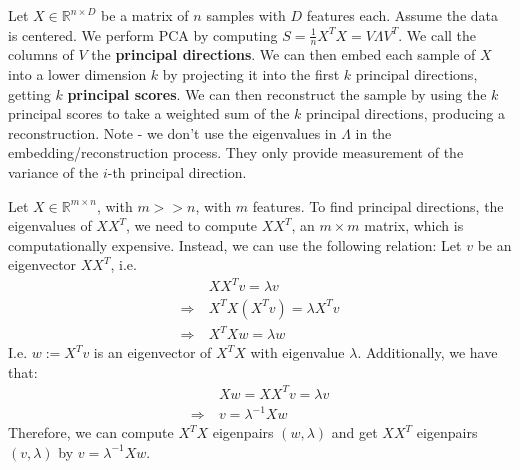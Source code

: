\documentclass{article}
\begin{document}
\begin{remark}[Summary]
Let $X \in \mathbb{R}^{n \times D}$ be a matrix of $n$ samples with $D$ features each. Assume the data is centered. 
We perform PCA by computing $S = \frac{1}{n} X^{T} X = V \Lambda V^{T}$. 
We call the columns of $V$ the \textbf{principal directions}. 
We can then embed each sample of $X$ into a lower dimension $k$  by projecting it into the first $k$ principal directions, getting $k$ \textbf{principal scores}. 
We can then reconstruct the sample by using the $k$ principal scores to take a weighted sum of the $k$ principal directions, producing a reconstruction.
Note - we don't use the eigenvalues in $\Lambda$ in the embedding/reconstruction process. 
They only provide measurement of the variance of the $i$-th principal direction. 
\end{remark}

\begin{remark} Let $X \in \mathbb{R}^{m \times n}$, with $m >> n$, with $m$ features. To find principal directions, the eigenvalues of $X X^{T}$, we need to  compute $X X^{T}$, an $m \times m$ matrix, which is computationally expensive. Instead, we can use the following relation: Let $v$ be an eigenvector $X X ^{T}$, i.e.
\begin{align*}
  & XX^{T}v = \lambda v \\
  \Rightarrow \ & X^{T}X (X^{T}v) = \lambda X^{T}v \\
  \Rightarrow \ & X^{T} X w = \lambda w
\end{align*}
  I.e. $w := X^{T}v$  is an eigenvector of $X^{T}X$ with eigenvalue $\lambda$. Additionally, we have that:
\begin{align*}
  & X w = X X^{T}v = \lambda v \\
  \Rightarrow \ & v = \lambda ^{-1} X w
\end{align*}
  Therefore, we can compute $X^{T}X$ eigenpairs $(w, \lambda)$ and get $X X^{T}$ eigenpairs $(v, \lambda)$ by $v = \lambda ^{-1} X w$. 
\end{remark}
\end{document}
